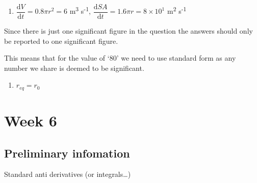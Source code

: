 \documentclass[
]{book}
\providecommand{\tightlist}{%
  \setlength{\itemsep}{0pt}\setlength{\parskip}{0pt}}
\begin{document}
\begin{enumerate}
\def\labelenumi{\arabic{enumi}.}
\tightlist
\item
  \(\dfrac{\textrm{d}V}{\textrm{d}t}= 0.8 \pi r^2= 6\) m\textsuperscript{3} s\textsuperscript{-1}, \(\dfrac{\textrm{d}SA}{\textrm{d}t}=1.6 \pi r = 8 \times 10^1\) m\textsuperscript{2} s\textsuperscript{-1}
\end{enumerate}

Since there is just one significant figure in the question the answers should only be reported to one significant figure.

This means that for the value of `80' we need to use standard form as any number we share is deemed to be significant.

\begin{enumerate}
\def\labelenumi{\arabic{enumi}.}
\tightlist
\item
  \(r_{eq}=r_0\)
\end{enumerate}

\hypertarget{ch:Workshop6}{%
\chapter{Week 6}\label{ch:Workshop6}}

\hypertarget{sec:Prelim6}{%
\section{Preliminary infomation}\label{sec:Prelim6}}

Standard anti derivatives (or integrals\ldots)
\end{document}
